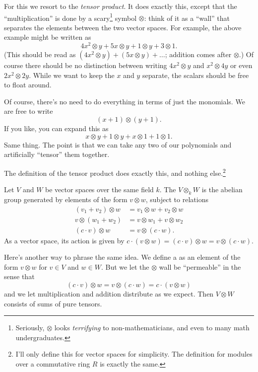 For this we resort to the \emph{tensor product}.
It does exactly this, except that the ``multiplication''
is done by a scary\footnote{%
	Seriously, $\otimes$ looks \emph{terrifying} to non-mathematicians,
	and even to many math undergraduates.}
symbol $\otimes$:
think of it as a ``wall'' that separates the elements
between the two vector spaces.
For example, the above example might be written as
\[ 4x^2 \otimes y + 5x \otimes y + 1 \otimes y + 3 \otimes 1. \]
(This should be read as $(4x^2 \otimes y) + (5x \otimes y) + \dots$;
addition comes after $\otimes$.)
Of course there should be no distinction
between writing $4x^2 \otimes y$ and $x^2 \otimes 4y$
or even $2x^2 \otimes 2y$.
While we want to keep the $x$ and $y$ separate,
the scalars should be free to float around.

Of course, there's no need to do everything
in terms of just the monomials.
We are free to write
\[ (x + 1) \otimes (y + 1). \]
If you like, you can expand this as
\[ x \otimes y + 1 \otimes y + x \otimes 1 + 1 \otimes 1. \]
Same thing.
The point is that we can take any two of our polynomials
and artificially ``tensor'' them together.

The definition of the tensor product does exactly this,
and nothing else.\footnote{I'll only define this
	for vector spaces for simplicity.
	The definition for modules over a commutative ring $R$ is exactly the same.}
\begin{definition}
	Let $V$ and $W$ be vector spaces over the same field $k$.
	The  $V \otimes_k W$ is the abelian group
	generated by elements of the form $v \otimes w$, subject to relations
	\begin{align*}
		(v_1 + v_2) \otimes w &= v_1 \otimes w + v_2 \otimes w \\
		v \otimes (w_1 + w_2) &= v \otimes w_1 + v \otimes w_2 \\
		(c \cdot v) \otimes w &= v \otimes (c \cdot w).
	\end{align*}
	As a vector space,
	its action is given by
	$c \cdot (v \otimes w) = (c \cdot v) \otimes w = v \otimes (c \cdot w)$.
\end{definition}
Here's another way to phrase the same idea.
We define a  as an
element of the form $v \otimes w$ for $v \in V$ and $w \in W$.
But we let the $\otimes$ wall be ``permeable'' in the sense that
\[ (c \cdot v) \otimes w = v \otimes (c \cdot w) = c \cdot (v \otimes w) \]
and we let multiplication and addition distribute as we expect.
Then $V \otimes W$ consists of sums of pure tensors.

